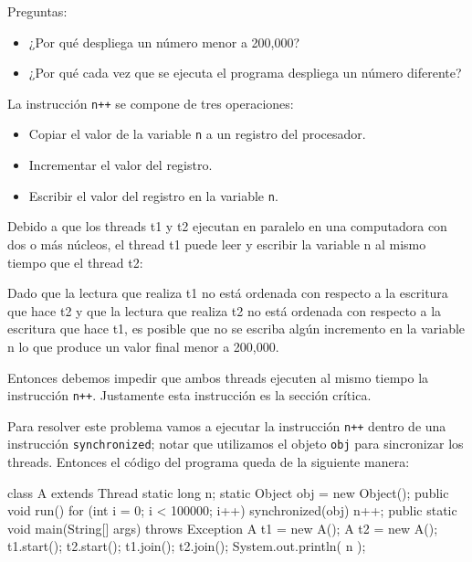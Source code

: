 Preguntas:

\begin{itemize}

\item ¿Por qué despliega un número menor a 200,000?

\item ¿Por qué cada vez que se ejecuta el programa despliega un número diferente?

\end{itemize}

La instrucción \texttt{n++} se compone de tres operaciones:

\begin{itemize}

\item Copiar el valor de la variable \texttt{n} a un registro del procesador.

\item Incrementar el valor del registro.

\item Escribir el valor del registro en la variable \texttt{n}.

\end{itemize}

Debido a que los threads t1 y t2 ejecutan en paralelo en una computadora con dos o más núcleos, el thread t1 puede leer y escribir la variable n al mismo tiempo que el thread t2:

Dado que la lectura que realiza t1 no está ordenada con respecto a la escritura que hace t2 y que la lectura que realiza t2 no está ordenada con respecto a la escritura que hace t1, es posible que no se escriba algún incremento en la variable n lo que produce un valor final menor a 200,000.

Entonces debemos impedir que ambos threads ejecuten al mismo tiempo la instrucción \texttt{n++}. Justamente esta instrucción es la sección crítica.

Para resolver este problema vamos a ejecutar la instrucción \texttt{n++} dentro de una instrucción \texttt{synchronized}; notar que utilizamos el objeto \texttt{obj} para sincronizar los threads.
Entonces el código del programa queda de la siguiente manera:

\begin{SourceCode}
class A extends Thread
{
  static long n;
  static Object obj = new Object();
  public void run()
  {
    for (int i = 0; i < 100000; i++)
      synchronized(obj)
      {
        n++;
      }
  }
  public static void main(String[] args) throws Exception
  {
    A t1 = new A();
    A t2 = new A();
    t1.start();
    t2.start();
    t1.join();
    t2.join();
    System.out.println( n );
  }
}
\end{SourceCode}

